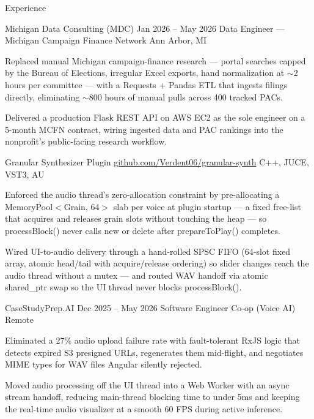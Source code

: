 \documentclass[
	11pt
]{../../../template}
\begin{document}
	\begin{rSection}{E}{xperience}
		\begin{rSectionEntry}
			{Michigan Data Consulting (MDC)}
			{Jan 2026 -- May 2026}
			{Data Engineer --- Michigan Campaign Finance Network}
			{}
			{Ann Arbor, MI}

			\item Replaced manual Michigan campaign-finance research --- portal searches capped by the Bureau of Elections, irregular Excel exports, hand normalization at $\sim$2 hours per committee --- with a Requests + Pandas ETL that ingests filings directly, eliminating $\sim$800 hours of manual pulls across 400 tracked PACs.
			\item Delivered a production Flask REST API on AWS EC2 as the sole engineer on a 5-month MCFN contract, wiring ingested data and PAC rankings into the nonprofit's public-facing research workflow.
		\end{rSectionEntry}

		\begin{rSectionEntry}
			{Granular Synthesizer Plugin}
			{\href{https://github.com/Verdent06/granular-synth}{github.com/Verdent06/granular-synth}}
			{}
			{C++, JUCE, VST3, AU}
			{}

			\item Enforced the audio thread's zero-allocation constraint by pre-allocating a MemoryPool$<$Grain, 64$>$ slab per voice at plugin startup --- a fixed free-list that acquires and releases grain slots without touching the heap --- so processBlock() never calls new or delete after prepareToPlay() completes.
			\item Wired UI-to-audio delivery through a hand-rolled SPSC FIFO (64-slot fixed array, atomic head/tail with acquire/release ordering) so slider changes reach the audio thread without a mutex --- and routed WAV handoff via atomic shared\_ptr swap so the UI thread never blocks processBlock().
		\end{rSectionEntry}

		\begin{rSectionEntry}
			{CaseStudyPrep.AI}
			{Dec 2025 -- May 2026}
			{Software Engineer Co-op (Voice AI)}
			{}
			{Remote}

			\item Eliminated a 27\% audio upload failure rate with fault-tolerant RxJS logic that detects expired S3 presigned URLs, regenerates them mid-flight, and negotiates MIME types for WAV files Angular silently rejected.
			\item Moved audio processing off the UI thread into a Web Worker with an async stream handoff, reducing main-thread blocking time to under 5ms and keeping the real-time audio visualizer at a smooth 60 FPS during active inference.
		\end{rSectionEntry}


\end{rSection}
\end{document}
